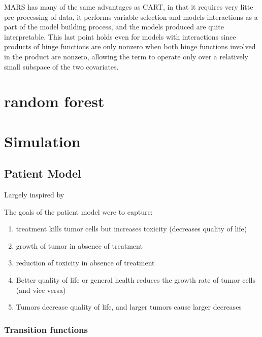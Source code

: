 \documentclass[12pt]{article}
\begin{document}
MARS has many of the same advantages as CART, in that it requires very litte pre-processing of data, it performs variable selection and models interactions as a part of the model building process, and the models produced are quite interpretable. This last point holds even for models with interactions since products of hinge functions are only nonzero when both hinge functions involved in the product are nonzero, allowing the term to operate only over a relatively small subspace of the two covariates. 



\section{random forest} %
\label{sec:random_forest}


\section{Simulation}

\subsection{Patient Model} %
\label{sub:vpm}

Largely inspired by \cite{paper}

The goals of the patient model were to capture:

\begin{enumerate}
  \item treatment kills tumor cells but increases toxicity (decreases quality of life)
  \item growth of tumor in absence of treatment
  \item reduction of toxicity in absence of treatment
  \item Better quality of life or general health reduces the growth rate of tumor cells (and vice versa)
  \item Tumors decrease quality of life, and larger tumors cause larger decreases
\end{enumerate} 

\subsubsection{Transition functions} %
\label{ssub:transition_functions}
\end{document}
